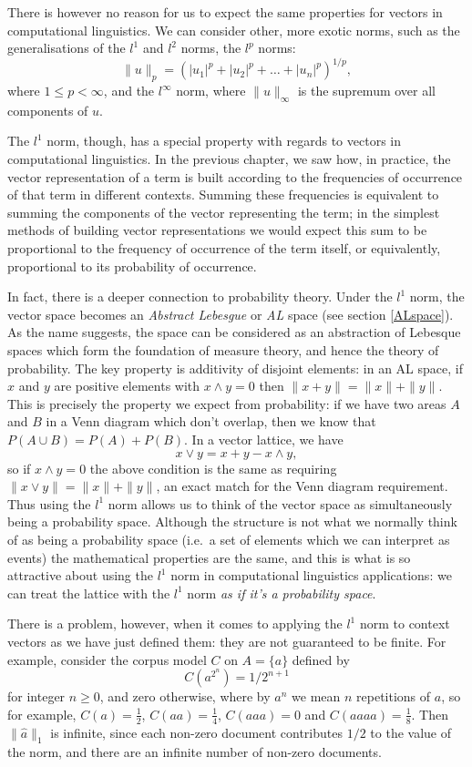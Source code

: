 There is however no reason for us to expect the same properties for vectors in computational linguistics. We can consider other, more exotic norms, such as the generalisations of the $l^1$ and $l^2$ norms, the $l^p$ norms:
$$\|u\|_p = (|u_1|^p + |u_2|^p +\ldots + |u_n|^p)^{1/p},$$
where $1 \le p < \infty$, and the $l^\infty$ norm, where $\|u\|_\infty$ is the supremum over all components of $u$.

The $l^1$ norm, though, has a special property with regards to vectors in computational linguistics. In the previous chapter, we saw  how, in practice, the vector representation of a term is built according to the frequencies of occurrence of that term in different contexts. Summing these frequencies is equivalent to summing the components of the vector representing the term; in the simplest methods of building vector representations we would expect this sum to be proportional to the frequency of occurrence of the term itself, or equivalently, proportional to its probability of occurrence.

In fact, there is a deeper connection to probability theory. Under the $l^1$ norm, the vector space becomes an \emph{Abstract Lebesgue} or \emph{AL} space (see section \ref{ALspace}). As the name suggests, the space can be considered as an abstraction of Lebesque spaces which form the foundation of measure theory, and hence the theory of probability. The key property is additivity of disjoint elements: in an AL space, if $x$ and $y$ are positive elements with $x \land y = 0$ then $\|x + y\| = \|x\| + \|y\|$. This is precisely the property we expect from probability: if we have two areas $A$ and $B$ in a Venn diagram which don't overlap, then we know that $P(A\cup B) = P(A) + P(B)$. In a vector lattice, we have
$$x \lor y = x + y - x \land y,$$
so if $x\land y = 0$ the above condition is the same as requiring $\|x \lor y\| = \|x\| + \|y\|$, an exact match for the Venn diagram requirement. Thus using the $l^1$ norm allows us to think of the vector space as simultaneously being a probability space. Although the structure is not what we normally think of as being a probability space (i.e.~a set of elements which we can interpret as events) the mathematical properties are the same, and this is what is so attractive about using the $l^1$ norm in computational linguistics applications: we can treat the lattice with the $l^1$ norm \emph{as if it's a probability space}.

There is a problem, however, when it comes to applying the $l^1$ norm to context vectors as we have just defined them: they are not guaranteed to be finite. For example, consider the corpus model $C$ on $A = \{a\}$ defined by
$$C(a^{2^n}) = 1/2^{n+1}$$
for integer $n \ge 0$, and zero otherwise, where by $a^n$ we mean $n$ repetitions of $a$, so for example, $C(a) = \frac{1}{2}$, $C(aa) = \frac{1}{4}$, $C(aaa) = 0$ and $C(aaaa) = \frac{1}{8}$. Then $\|\hat{a}\|_1$ is infinite, since each non-zero document contributes $1/2$ to the value of the norm, and there are an infinite number of non-zero documents.

